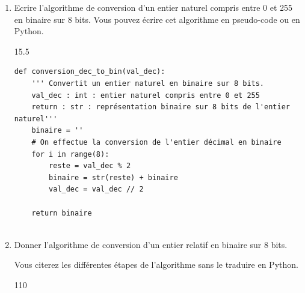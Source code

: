 \documentclass[a4paper,10pt]{report}
\begin{document}
\begin{enumerate}
    \item Ecrire l'algorithme de conversion d'un entier naturel compris entre 0 et 255 en binaire sur 8 bits. Vous pouvez écrire cet algorithme en pseudo-code ou en Python.
    
    \begin{answer}{1}{5.5 }
        \begin{verbatim}
def conversion_dec_to_bin(val_dec):
    ''' Convertit un entier naturel en binaire sur 8 bits.
    val_dec : int : entier naturel compris entre 0 et 255   
    return : str : représentation binaire sur 8 bits de l'entier naturel'''
    binaire = ''
    # On effectue la conversion de l'entier décimal en binaire
    for i in range(8):
        reste = val_dec % 2
        binaire = str(reste) + binaire
        val_dec = val_dec // 2
    
    return binaire
        
        \end{verbatim}
        
        
        
        
        \end{answer}

    \item Donner l'algorithme de conversion d'un entier relatif en binaire sur 8 bits.
    
    Vous citerez les différentes étapes de l'algorithme sans le traduire en Python.
    \begin{answer}{1}{10}
    

\end{answer}
\end{enumerate}
\end{document}

